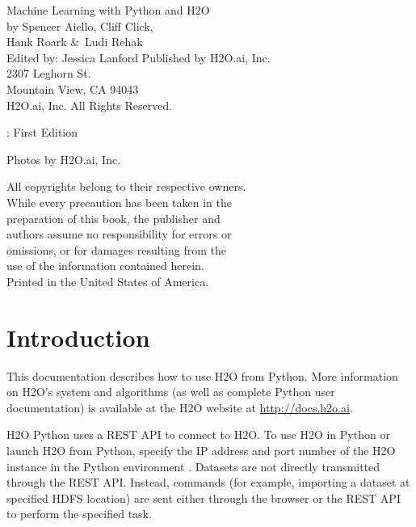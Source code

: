 {\raggedright 

Machine Learning with Python and H2O\\
  by Spencer Aiello, Cliff Click, \\ Hank Roark \&\  Ludi Rehak\\
Edited by: Jessica Lanford
\bigskip
  Published by H2O.ai, Inc. \\
2307 Leghorn St. \\
Mountain View, CA 94043\\
\bigskip
\textcopyright \the\year \hspace{1pt} H2O.ai, Inc. All Rights Reserved. 
\bigskip

\monthname \hspace{1pt}  \the\year: First Edition 
\bigskip

Photos by \textcopyright H2O.ai, Inc.
\bigskip

All copyrights belong to their respective owners.\\
While every precaution has been taken in the\\
preparation of this book, the publisher and\\
authors assume no responsibility for errors or\\
omissions, or for damages resulting from the\\
use of the information contained herein.\\
\bigskip
Printed in the United States of America. 
}


\newpage
\thispagestyle{empty}%

\tableofcontents
\thispagestyle{empty}%

\newpage

\section{Introduction}

This documentation describes how to use H2O from Python. More information on H2O's system and algorithms
(as well as complete Python user documentation) is available at the H2O website at {\url{http://docs.h2o.ai}}.

H2O Python uses a REST API to connect to H2O. To use H2O in Python or launch H2O from Python, specify the IP address and port number of the H2O instance in the Python environment . Datasets are not directly transmitted
through the REST API. Instead, commands (for example, importing a dataset at specified HDFS location) are sent either through the browser or the REST API to perform the specified task.

